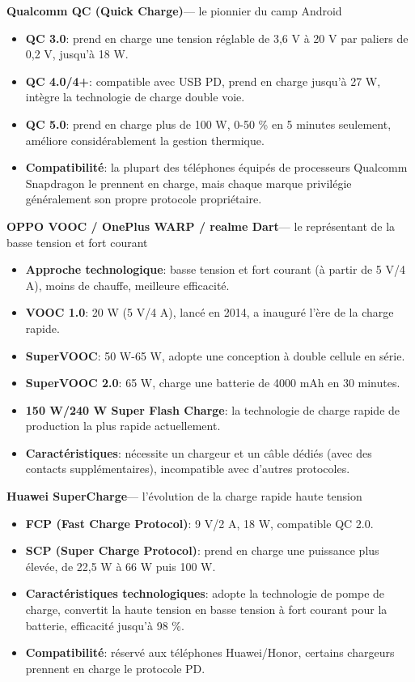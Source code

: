 \textbf{Qualcomm QC (Quick Charge)}— le pionnier du camp Android

\begin{itemize}
  \item \textbf{QC 3.0}: prend en charge une tension réglable de 3,6 V à 20 V par paliers de 0,2 V, jusqu'à 18 W.
  \item \textbf{QC 4.0/4+}: compatible avec USB PD, prend en charge jusqu'à 27 W, intègre la technologie de charge double voie.
  \item \textbf{QC 5.0}: prend en charge plus de 100 W, 0-50 \% en 5 minutes seulement, améliore considérablement la gestion thermique.
  \item \textbf{Compatibilité}: la plupart des téléphones équipés de processeurs Qualcomm Snapdragon le prennent en charge, mais chaque marque privilégie généralement son propre protocole propriétaire.
\end{itemize}

\textbf{OPPO VOOC / OnePlus WARP / realme Dart}— le représentant de la basse tension et fort courant

\begin{itemize}
  \item \textbf{Approche technologique}: basse tension et fort courant (à partir de 5 V/4 A), moins de chauffe, meilleure efficacité.
  \item \textbf{VOOC 1.0}: 20 W (5 V/4 A), lancé en 2014, a inauguré l'ère de la charge rapide.
  \item \textbf{SuperVOOC}: 50 W-65 W, adopte une conception à double cellule en série.
  \item \textbf{SuperVOOC 2.0}: 65 W, charge une batterie de 4000 mAh en 30 minutes.
  \item \textbf{150 W/240 W Super Flash Charge}: la technologie de charge rapide de production la plus rapide actuellement.
  \item \textbf{Caractéristiques}: nécessite un chargeur et un câble dédiés (avec des contacts supplémentaires), incompatible avec d'autres protocoles.
\end{itemize}

\textbf{Huawei SuperCharge}— l'évolution de la charge rapide haute tension

\begin{itemize}
  \item \textbf{FCP (Fast Charge Protocol)}: 9 V/2 A, 18 W, compatible QC 2.0.
  \item \textbf{SCP (Super Charge Protocol)}: prend en charge une puissance plus élevée, de 22,5 W à 66 W puis 100 W.
  \item \textbf{Caractéristiques technologiques}: adopte la technologie de pompe de charge, convertit la haute tension en basse tension à fort courant pour la batterie, efficacité jusqu'à 98 \%.
  \item \textbf{Compatibilité}: réservé aux téléphones Huawei/Honor, certains chargeurs prennent en charge le protocole PD.
\end{itemize}

